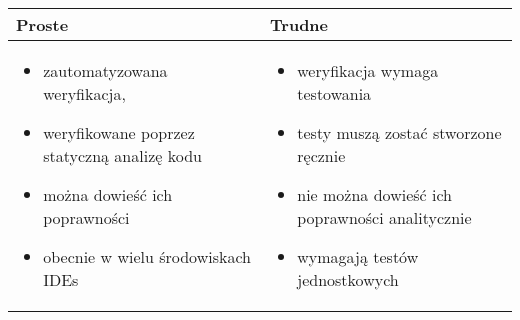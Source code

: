 \documentclass[../main.tex]{subfiles}
\begin{document}
    \begin{table}[H]
        \begin{center}
            \begin{tabular}{ p{8cm} p{8cm} }
                \textbf{Proste} & \textbf{Trudne} \\
                \toprule
                \begin{itemize}
                    \item zautomatyzowana weryfikacja,
                    \item weryfikowane poprzez statyczną analizę kodu
                    \item można dowieść ich poprawności
                    \item obecnie w wielu środowiskach IDEs
                \end{itemize}
                &
                \begin{itemize}
                    \item weryfikacja wymaga testowania
                    \item testy muszą zostać stworzone ręcznie
                    \item nie można dowieść ich poprawności analitycznie
                    \item wymagają testów jednostkowych
                \end{itemize}
            \end{tabular}
        \end{center}
    \end{table}
\end{document}
